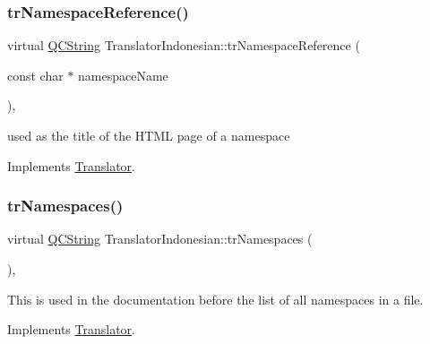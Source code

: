 \mbox{\label{class_translator_indonesian_a8c5f3cc65c3b01f789b949648da7236e}} 
\subsubsection{\texorpdfstring{trNamespaceReference()}{trNamespaceReference()}}
{\footnotesize\ttfamily virtual \mbox{\hyperlink{class_q_c_string}{Q\+C\+String}} Translator\+Indonesian\+::tr\+Namespace\+Reference (\begin{DoxyParamCaption}\item[{const char $\ast$}]{namespace\+Name }\end{DoxyParamCaption})\hspace{0.3cm}{\ttfamily [inline]}, {\ttfamily [virtual]}}

used as the title of the H\+T\+ML page of a namespace 

Implements \mbox{\hyperlink{class_translator}{Translator}}.

\mbox{\label{class_translator_indonesian_a7f1c7067df20ca5319e34f388c4a0487}} 
\subsubsection{\texorpdfstring{trNamespaces()}{trNamespaces()}}
{\footnotesize\ttfamily virtual \mbox{\hyperlink{class_q_c_string}{Q\+C\+String}} Translator\+Indonesian\+::tr\+Namespaces (\begin{DoxyParamCaption}{ }\end{DoxyParamCaption})\hspace{0.3cm}{\ttfamily [inline]}, {\ttfamily [virtual]}}

This is used in the documentation before the list of all namespaces in a file. 

Implements \mbox{\hyperlink{class_translator}{Translator}}.

\mbox{\label{class_translator_indonesian_ae678b749dff3e7dcf0a5eeea348d33b5}} 
